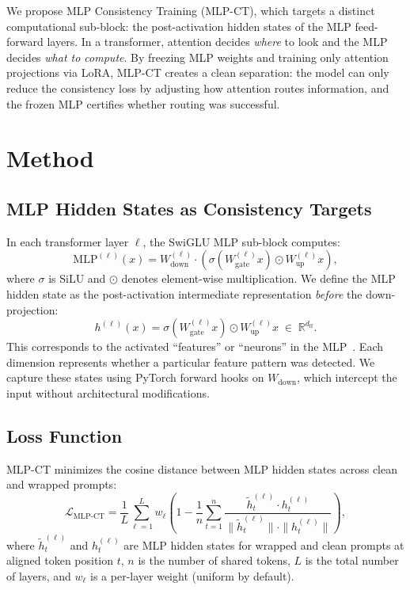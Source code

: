 \documentclass[12pt, letterpaper]{article}
\begin{document}
We propose MLP Consistency Training (MLP-CT), which targets a distinct computational sub-block: the post-activation hidden states of the MLP feed-forward layers. In a transformer, attention decides \emph{where} to look and the MLP decides \emph{what to compute}. By freezing MLP weights and training only attention projections via LoRA, MLP-CT creates a clean separation: the model can only reduce the consistency loss by adjusting how attention routes information, and the frozen MLP certifies whether routing was successful.

\section{Method}

\subsection{MLP Hidden States as Consistency Targets}

In each transformer layer $\ell$, the SwiGLU MLP sub-block computes:
\begin{equation}
    \text{MLP}^{(\ell)}(x) = W_{\text{down}}^{(\ell)} \cdot \left( \sigma\!\left(W_{\text{gate}}^{(\ell)} x\right) \odot W_{\text{up}}^{(\ell)} x \right),
\end{equation}
where $\sigma$ is SiLU and $\odot$ denotes element-wise multiplication. We define the MLP hidden state as the post-activation intermediate representation \emph{before} the down-projection:
\begin{equation}
    h^{(\ell)}(x) = \sigma\!\left(W_{\text{gate}}^{(\ell)} x\right) \odot W_{\text{up}}^{(\ell)} x \;\in\; \mathbb{R}^{d_{\text{ff}}}.
\end{equation}
This corresponds to the activated ``features'' or ``neurons'' in the MLP~\citep{geva2021transformer}. Each dimension represents whether a particular feature pattern was detected. We capture these states using PyTorch forward hooks on $W_{\text{down}}$, which intercept the input without architectural modifications.

\subsection{Loss Function}

MLP-CT minimizes the cosine distance between MLP hidden states across clean and wrapped prompts:
\begin{equation}
    \mathcal{L}_{\text{MLP-CT}} = \frac{1}{L} \sum_{\ell=1}^{L} w_\ell \left( 1 - \frac{1}{n} \sum_{t=1}^{n} \frac{\tilde{h}^{(\ell)}_t \cdot h^{(\ell)}_t}{\|\tilde{h}^{(\ell)}_t\| \cdot \|h^{(\ell)}_t\|} \right),
\end{equation}
where $\tilde{h}^{(\ell)}_t$ and $h^{(\ell)}_t$ are MLP hidden states for wrapped and clean prompts at aligned token position $t$, $n$ is the number of shared tokens, $L$ is the total number of layers, and $w_\ell$ is a per-layer weight (uniform by default).
\end{document}
